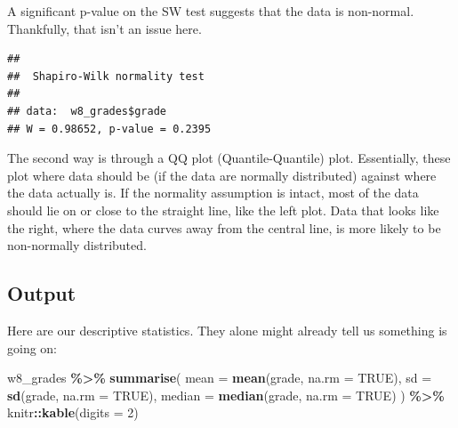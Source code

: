 \documentclass[
]{book}
\newenvironment{Shaded}{\begin{snugshade}}{\end{snugshade}}
\newcommand{\AttributeTok}[1]{\textcolor[rgb]{0.13,0.29,0.53}{#1}}
\newcommand{\ConstantTok}[1]{\textcolor[rgb]{0.56,0.35,0.01}{#1}}
\newcommand{\DecValTok}[1]{\textcolor[rgb]{0.00,0.00,0.81}{#1}}
\newcommand{\FunctionTok}[1]{\textcolor[rgb]{0.13,0.29,0.53}{\textbf{#1}}}
\newcommand{\NormalTok}[1]{#1}
\newcommand{\SpecialCharTok}[1]{\textcolor[rgb]{0.81,0.36,0.00}{\textbf{#1}}}
\begin{document}
A significant p-value on the SW test suggests that the data is non-normal. Thankfully, that isn't an issue here.

\begin{Shaded}
\end{Shaded}

\begin{verbatim}
## 
##  Shapiro-Wilk normality test
## 
## data:  w8_grades$grade
## W = 0.98652, p-value = 0.2395
\end{verbatim}

The second way is through a QQ plot (Quantile-Quantile) plot. Essentially, these plot where data should be (if the data are normally distributed) against where the data actually is. If the normality assumption is intact, most of the data should lie on or close to the straight line, like the left plot. Data that looks like the right, where the data curves away from the central line, is more likely to be non-normally distributed.



\hypertarget{output-2}{%
\subsection{Output}\label{output-2}}

Here are our descriptive statistics. They alone might already tell us something is going on:

\begin{Shaded}
\begin{Highlighting}[]
\NormalTok{w8\_grades }\SpecialCharTok{\%\textgreater{}\%}
  \FunctionTok{summarise}\NormalTok{(}
    \AttributeTok{mean =} \FunctionTok{mean}\NormalTok{(grade, }\AttributeTok{na.rm =} \ConstantTok{TRUE}\NormalTok{),}
    \AttributeTok{sd =} \FunctionTok{sd}\NormalTok{(grade, }\AttributeTok{na.rm =} \ConstantTok{TRUE}\NormalTok{),}
    \AttributeTok{median =} \FunctionTok{median}\NormalTok{(grade, }\AttributeTok{na.rm =} \ConstantTok{TRUE}\NormalTok{)}
\NormalTok{  ) }\SpecialCharTok{\%\textgreater{}\%}
\NormalTok{  knitr}\SpecialCharTok{::}\FunctionTok{kable}\NormalTok{(}\AttributeTok{digits =} \DecValTok{2}\NormalTok{)}
\end{Highlighting}
\end{Shaded}
\end{document}
